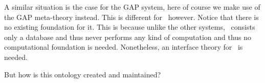 \begin{description}
    A similar situation is the case for the GAP system, here of course we make use of the GAP meta-theory instead. 
    This is different for \lmfdb\ however. 
    Notice that there is no existing foundation for it. 
    This is because unlike the other systems, \lmfdb\ consists only a database and thus never performs any kind of computation and thus no computational foundation is needed. 
    Nonetheless, an interface theory for \lmfdb\ is needed. 
    
\end{description}

But how is this ontology created and maintained?
